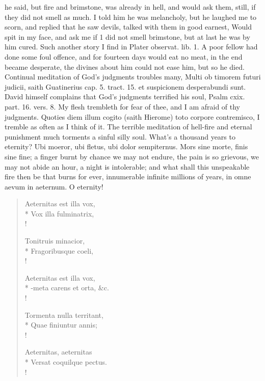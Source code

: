 {he said, but fire and brimstone, was already in hell, and would ask
them, still, if they did not smell as much. I told him he was
melancholy, but he laughed me to scorn, and replied that he saw devils,
talked with them in good earnest, Would spit in my face, and ask me if
1 did not smell brimstone, but at last he was by him cured. Such
another story I find in Plater observat. lib. 1. A poor fellow had done
some foul offence, and for fourteen days would eat no meat, in the end
became desperate, the divines about him could not ease him, but
so he died. Continual meditation of God's judgments troubles many,
Multi ob timorem futuri judicii, saith Guatinerius cap. 5. tract. 15.
et suspicionem desperabundi sunt. David himself complains that God's
judgments terrified his soul, Psalm cxix. part. 16. vers. 8. My flesh
trembleth for fear of thee, and I am afraid of thy judgments. Quoties
diem illum cogito (saith Hierome) toto corpore contremisco, I
tremble as often as I think of it. The terrible meditation of hell-fire
and eternal punishment much torments a sinful silly soul. What's a
thousand years to eternity? Ubi moeror, ubi fletus, ubi dolor
sempiternus. Mors sine morte, finis sine fine; a finger burnt by chance
we may not endure, the pain is so grievous, we may not abide an hour, a
night is intolerable; and what shall this unspeakable fire then be that
burns for ever, innumerable infinite millions of years, in omne aevum
in aeternum. O eternity!


\begin{latin}
\begin{verse}
Aeternitas est illa vox,\\*
Vox illa fulminatrix,\\!

Tonitruis minacior,\\*
Fragoribusque coeli,\\!

Aeternitas est illa vox,\\*
-meta carens et orta, \&c.\\!

Tormenta nulla territant,\\*
Quae finiuntur annis;\\!

Aeternitas, aeternitas\\*
Versat coquilque pectus.\\!


\end{verse}
\end{latin}}
